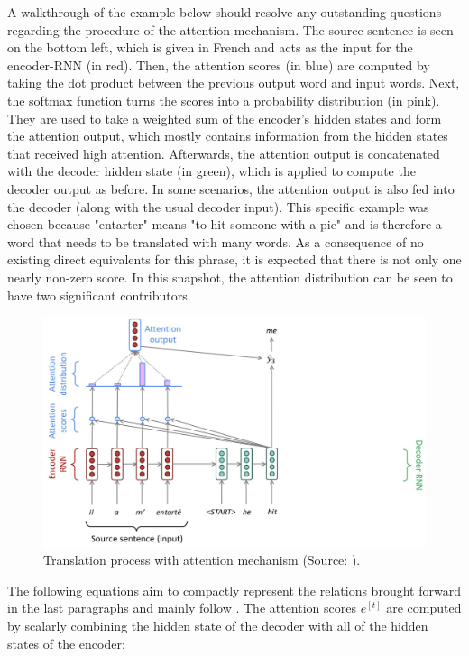 \documentclass[
]{krantz}
\begin{document}
A walkthrough of the example below should resolve any outstanding
questions regarding the procedure of the attention mechanism. The source
sentence is seen on the bottom left, which is given in French and acts
as the input for the encoder-RNN (in red). Then, the attention scores
(in blue) are computed by taking the dot product between the previous
output word and input words. Next, the softmax function turns the scores
into a probability distribution (in pink). They are used to take a
weighted sum of the encoder's hidden states and form the attention
output, which mostly contains information from the hidden states that
received high attention. Afterwards, the attention output is
concatenated with the decoder hidden state (in green), which is applied
to compute the decoder output as before. In some scenarios, the
attention output is also fed into the decoder (along with the usual
decoder input). This specific example was chosen because "entarter"
means "to hit someone with a pie" and is therefore a word that needs
to be translated with many words. As a consequence of no existing direct
equivalents for this phrase, it is expected that there is not only one
nearly non-zero score. In this snapshot, the attention distribution can
be seen to have two significant contributors.

\begin{figure}

{\centering \includegraphics[width=0.9\linewidth]{./figures/01-01-nlp/attention_ex_stanford} 

}

\caption{Translation process with attention mechanism (Source: \citet{Manning2022}).}\label{fig:attentionExStanford}
\end{figure}



The following equations aim to compactly represent the relations brought
forward in the last paragraphs and mainly follow \citet{Manning2022}. The
attention scores \(e^{[t]}\) are computed by scalarly combining the hidden
state of the decoder with all of the hidden states of the encoder:
\end{document}
